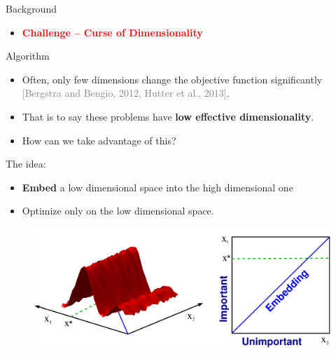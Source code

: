 \documentclass[final]{beamer}
\begin{document}
\begin{frame}[t]
\begin{columns}[T]
\begin{column}{.48\textwidth}
\begin{block}{Background}
 \begin{itemize}
    \item {\bf \textcolor{red}{ Challenge -- Curse of Dimensionality}}
   \end{itemize}
\end{block}

\begin{block}{Algorithm}

     \begin{itemize}
      \item Often, only few dimensions change the objective function significantly
       \textcolor{gray}{[Bergstra and Bengio, 2012, Hutter et al., 2013]}.
      \item That is to say these problems have 
       {\bf \textcolor{myColor}{low effective dimensionality}}.
       \item How can we take advantage of this?
     \end{itemize}

    
    The idea:
   \begin{itemize}
    \item {\bf \textcolor{myColor}{Embed}} 
     a low dimensional space into the high dimensional one
    \item Optimize
     only on the low dimensional space.
   \end{itemize}

  \begin{figure}[t]
   \includegraphics[width = 0.9\columnwidth]
   {../paper/figures/2to1embedding}
   \label{fig:ESSL_BLR}
  \end{figure}
  

\end{block}
\end{column}
\end{columns}
\end{frame}
\end{document}
